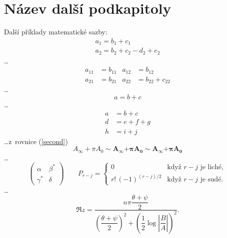 \section{Název další podkapitoly}
Další příklady matematické sazby:
\begin{gather}
a_1=b_1+c_1\\
a_2=b_2+c_2-d_2+e_2
\end{gather}
\ldots
\begin{align}
a_{11}& =b_{11}&
a_{12}& =b_{12}\\
a_{21}& =b_{21}&
a_{22}& =b_{22}+c_{22}
\end{align}
\ldots
\begin{equation}\label{first}
a=b+c
\end{equation}
\ldots
\begin{subequations}\label{grp}
\begin{align}
a&=b+c\label{second}\\
d&=e+f+g\label{third}\\
h&=i+j\label{fourth}
\end{align}
\end{subequations}
\ldots z~rovnice (\ref{second})
\[
A_\infty + \pi A_0
\sim \mathbf{A}_{\boldsymbol{\infty}} \boldsymbol{+}
\boldsymbol{\pi} \mathbf{A}_{\boldsymbol{0}}
\sim\pmb{A}_{\pmb{\infty}} \pmb{+}\pmb{\pi} \pmb{A}_{\pmb{0}}
\]
\ldots
\[
\begin{pmatrix}
\alpha& \beta^{*}\\
\gamma^{*}& \delta
\end{pmatrix}\qquad
P_{r-j}=\begin{cases}
0& \text{když $r-j$ je liché},\\
r!\,(-1)^{(r-j)/2}& \text{když $r-j$ je sudé}.
\end{cases}
\]
\ldots
\begin{equation}
\Re{z} =\frac{n\pi \dfrac{\theta +\psi}{2}}{
\left(\dfrac{\theta +\psi}{2}\right)^2 + \left( \dfrac{1}{2}
\log \left\lvert\dfrac{B}{A}\right\rvert\right)^2}.
\end{equation}
